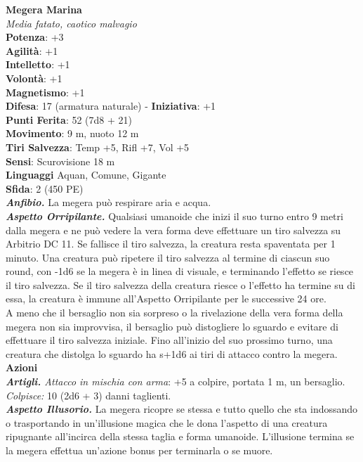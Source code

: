 \begin{multicols}{2}
\medskip\textbf{Megera Marina}\\
\emph{Media fatato, caotico malvagio}\\
\textbf{Potenza}: +3\\
\textbf{Agilità}: +1\\
\textbf{Intelletto}: +1\\
\textbf{Volontà}: +1\\
\textbf{Magnetismo}: +1\\
\textbf{Difesa}: 17 (armatura naturale) - \textbf{Iniziativa}: +1\\
\textbf{Punti Ferita}: 52 (7d8 + 21)\\
\textbf{Movimento}: 9 m, nuoto 12 m\\
\textbf{Tiri Salvezza}: Temp +5, Rifl +7, Vol +5\\
\textbf{Sensi}: Scurovisione 18 m\\
\textbf{Linguaggi} Aquan, Comune, Gigante\\
\textbf{Sfida}: 2 (450 PE)\smallskip\\
\emph{\textbf{Anfibio.}} La megera può respirare aria e acqua.\\
\emph{\textbf{Aspetto Orripilante.}} Qualsiasi umanoide che inizi il suo turno entro 9 metri dalla megera e ne può vedere la vera forma deve effettuare un tiro salvezza su Arbitrio DC 11. Se fallisce il tiro salvezza, la creatura resta spaventata per 1 minuto. Una creatura può ripetere il tiro salvezza al termine di ciascun suo round, con -1d6 se la megera è in linea di visuale, e terminando l'effetto se riesce il tiro salvezza. Se il tiro salvezza della creatura riesce o l'effetto ha termine su di essa, la creatura è immune all'Aspetto Orripilante per le successive 24 ore.\\
A meno che il bersaglio non sia sorpreso o la rivelazione della vera forma della megera non sia improvvisa, il bersaglio può distogliere lo sguardo e evitare di effettuare il tiro salvezza iniziale. Fino all'inizio del suo prossimo turno, una creatura che distolga lo sguardo ha s+1d6 ai tiri di attacco contro la megera.\\
\smallskip\textbf{Azioni}\\
\emph{\textbf{Artigli.} Attacco in mischia con arma}: +5 a colpire, portata 1 m, un bersaglio.\\
\emph{Colpisce:} 10 (2d6 + 3) danni taglienti.\\
\emph{\textbf{Aspetto Illusorio.}} La megera ricopre se stessa e tutto quello che sta indossando o trasportando in un'illusione magica che le dona l'aspetto di una creatura ripugnante all'incirca della stessa taglia e forma umanoide. L'illusione termina se la megera effettua un'azione bonus per terminarla o se muore.\\


\end{multicols}
